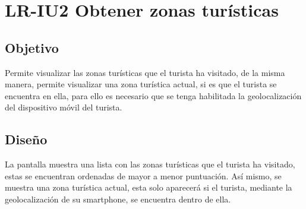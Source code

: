 \newpage
\section{LR-IU2 Obtener zonas turísticas}

\subsection{Objetivo}
Permite visualizar las zonas turísticas que el turista ha visitado, de la misma manera, permite visualizar una zona turística actual, si es que el turista se encuentra en ella, para ello es necesario que se tenga habilitada la geolocalización del dispositivo móvil del turista.

\subsection{Diseño}
La pantalla  muestra una lista con las zonas turísticas que el turista ha visitado, estas se encuentran ordenadas de mayor a menor puntuación. Así mismo, se muestra una zona turística actual, esta solo aparecerá si el turista, mediante la geolocalización de su smartphone, se encuentra dentro de ella.


